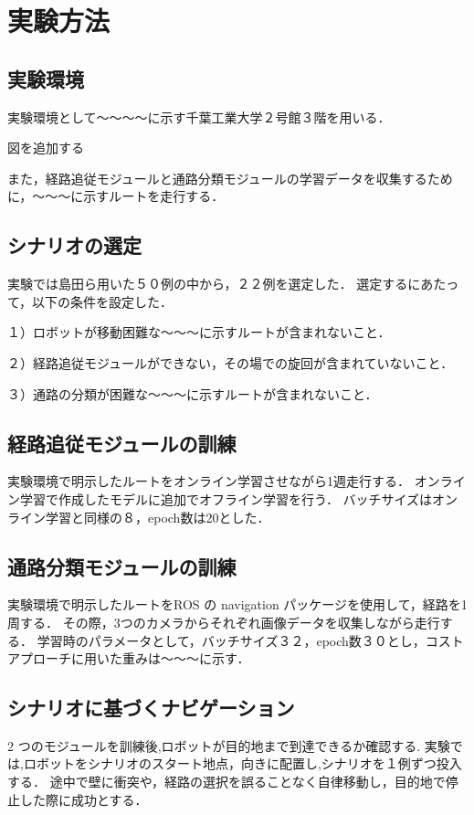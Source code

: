 \section{実験方法}
\subsection{実験環境}
実験環境として～～～～に示す千葉工業大学２号館３階を用いる．

図を追加する

また，経路追従モジュールと通路分類モジュールの学習データを収集するために，～～～に示すルートを走行する．

\subsection{シナリオの選定}
実験では島田ら用いた５０例の中から，２２例を選定した．
選定するにあたって，以下の条件を設定した．

１）ロボットが移動困難な～～～に示すルートが含まれないこと．

２）経路追従モジュールができない，その場での旋回が含まれていないこと．

３）通路の分類が困難な～～～に示すルートが含まれないこと．

\subsection{経路追従モジュールの訓練}
実験環境で明示したルートをオンライン学習させながら1週走行する．
オンライン学習で作成したモデルに追加でオフライン学習を行う．
バッチサイズはオンライン学習と同様の８，epoch数は20とした．

\subsection{通路分類モジュールの訓練}
実験環境で明示したルートをROS の navigation パッケージを使用して，経路を1周する．
その際，3つのカメラからそれぞれ画像データを収集しながら走行する．
学習時のパラメータとして，バッチサイズ３２，epoch数３０とし，コストアプローチに用いた重みは～～～に示す．

\subsection{シナリオに基づくナビゲーション}
2 つのモジュールを訓練後,ロボットが目的地まで到達できるか確認する.
実験では,ロボットをシナリオのスタート地点，向きに配置し,シナリオを１例ずつ投入する．
途中で壁に衝突や，経路の選択を誤ることなく自律移動し，目的地で停止した際に成功とする．